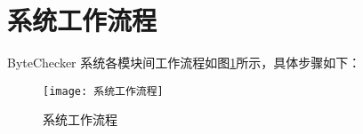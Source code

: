 \documentclass[print, master, vlined, timesmath]{DissertUESTC}
\begin{document}








\section{系统工作流程}
ByteChecker 系统各模块间工作流程如图\ref{fig:系统工作流程}所示，具体步骤如下：

\begin{figure}
    \centering
    \texttt{[image: 系统工作流程]}
    \caption{系统工作流程}
    \label{fig:系统工作流程}
\end{figure}
\end{document}
